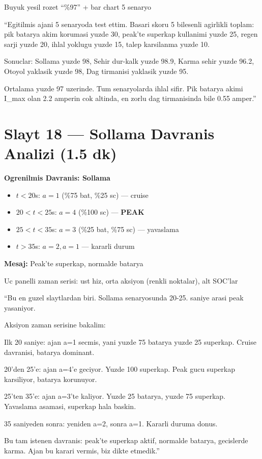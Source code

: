 \documentclass[11pt,a4paper]{article}
\begin{document}
\begin{gorselboks}
Buyuk yesil rozet ``\%97'' + bar chart 5 senaryo
\end{gorselboks}

\begin{sayboks}
``Egitilmis ajani 5 senaryoda test ettim. Basari skoru 5 bilesenli agirlikli toplam: pik batarya akim korumasi yuzde 30, peak'te superkap kullanimi yuzde 25, regen sarji yuzde 20, ihlal yoklugu yuzde 15, talep karsilanma yuzde 10.

Sonuclar: Sollama yuzde 98, Sehir dur-kalk yuzde 98.9, Karma sehir yuzde 96.2, Otoyol yaklasik yuzde 98, Dag tirmanisi yaklasik yuzde 95.

Ortalama yuzde 97 uzerinde. Tum senaryolarda ihlal sifir. Pik batarya akimi I\_max olan 2.2 amperin cok altinda, en zorlu dag tirmanisinda bile 0.55 amper.''
\end{sayboks}

\section{Slayt 18 --- Sollama Davranis Analizi (1.5 dk)}

\begin{slytboks}
\textbf{Ogrenilmis Davranis: Sollama}
\begin{itemize}
\item $t<20$s: $a=1$ (\%75 bat, \%25 sc) --- cruise
\item $20<t<25$s: $a=4$ (\%100 sc) --- \textbf{PEAK}
\item $25<t<35$s: $a=3$ (\%25 bat, \%75 sc) --- yavaslama
\item $t>35$s: $a=2, a=1$ --- kararli durum
\end{itemize}
\textbf{Mesaj:} Peak'te superkap, normalde batarya
\end{slytboks}

\begin{gorselboks}
Uc panelli zaman serisi: ust hiz, orta aksiyon (renkli noktalar), alt SOC'lar
\end{gorselboks}

\begin{sayboks}
``Bu en guzel slaytlardan biri. Sollama senaryosunda 20-25. saniye arasi peak yasaniyor.

Aksiyon zaman serisine bakalim:

Ilk 20 saniye: ajan a=1 secmis, yani yuzde 75 batarya yuzde 25 superkap. Cruise davranisi, batarya dominant.

20'den 25'e: ajan a=4'e geciyor. Yuzde 100 superkap. Peak gucu superkap karsiliyor, batarya korunuyor.

25'ten 35'e: ajan a=3'te kaliyor. Yuzde 25 batarya, yuzde 75 superkap. Yavaslama asamasi, superkap hala baskin.

35 saniyeden sonra: yeniden a=2, sonra a=1. Kararli duruma donus.

Bu tam istenen davranis: peak'te superkap aktif, normalde batarya, gecislerde karma. Ajan bu karari vermis, biz dikte etmedik.''
\end{sayboks}
\end{document}
